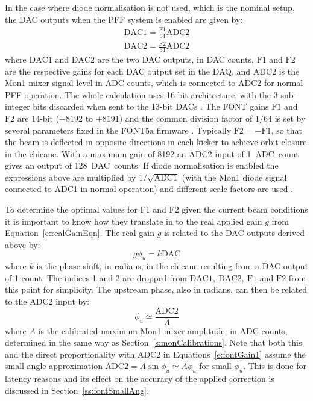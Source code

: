 In the case where diode normalisation is not used, which is the nominal setup, the DAC outputs when the PFF system is enabled are given by:
\begin{eqnarray}
\mathrm{DAC1} = \frac{\mathrm{F1}}{64}\mathrm{ADC2} \nonumber \\ 
\mathrm{DAC2} = \frac{\mathrm{F2}}{64}\mathrm{ADC2} \label{e:fontGain1}
\end{eqnarray}
where \(\mathrm{DAC1}\) and \(\mathrm{DAC2}\) are the two DAC outputs, in DAC counts, \(\mathrm{F1}\) and \(\mathrm{F2}\) are the respective gains for each DAC output set in the DAQ, and \(\mathrm{ADC2}\) is the Mon1 mixer signal level in ADC counts, which is connected to ADC2 for normal PFF operation. The whole calculation uses 16-bit architecture, with the 3 sub-integer bits discarded when sent to the 13-bit DACs \cite{glennPriv}. The FONT gains \(\mathrm{F1}\) and \(\mathrm{F2}\) are 14-bit (\(-8192\) to \(+8191\)) and the common division factor of \(1/64\) is set by several parameters fixed in the FONT5a firmware \cite{glennPriv}.
Typically \(\mathrm{F2} = -\mathrm{F1}\), so that the beam is deflected in opposite directions in each kicker to achieve orbit closure in the chicane. With a maximum gain of 8192 an ADC2 input of 1~ADC~count gives an output of 128~DAC~counts. If diode normalisation is enabled the expressions above are multiplied by \(1/\sqrt{\mathrm{ADC1}}\) (with the Mon1 diode signal connected to ADC1 in normal operation) and different scale factors are used \cite{glennPriv}.

To determine the optimal values for F1 and F2 given the current beam conditions it is important to know how they translate in to the real applied gain \(g\) from Equation~\ref{e:realGainEqn}. The real gain \(g\) is related to the DAC outputs derived above by:
\begin{equation} \label{e:fontGain2}
g\phi_u = k\mathrm{DAC}
\end{equation}
where \(k\) is the phase shift, in radians, in the chicane resulting from a DAC output of 1 count. The indices 1 and 2 are dropped from \(\mathrm{DAC1,~DAC2,~F1}\) and \(\mathrm{F2}\) from this point for simplicity. The upstream phase, also in radians, can then be related to the ADC2 input by:
\begin{equation} \label{e:fontGain3}
\phi_u \simeq \frac{\mathrm{ADC2}}{A}
\end{equation}
where \(A\) is the calibrated maximum Mon1 mixer amplitude, in ADC counts, determined in the same way as Section~\ref{s:monCalibrations}. Note that both this and the direct proportionality with ADC2 in Equations~\ref{e:fontGain1} assume the small angle approximation \(\mathrm{ADC2} = A\sin\phi_u \simeq A\phi_u\) for small \(\phi_u\). This is done for latency reasons \cite{glennPriv} and its effect on the accuracy of the applied correction is discussed in Section~\ref{ss:fontSmallAng}.

